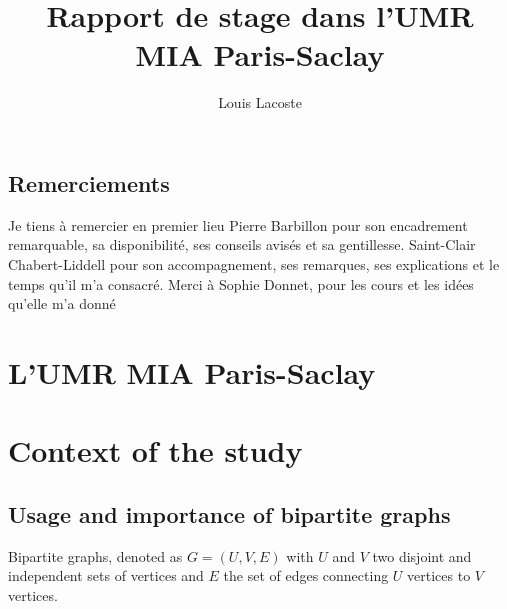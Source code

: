 \documentclass[12pt,a4paper]{report}
\title{Rapport de stage dans l'UMR MIA Paris-Saclay}
\author{Louis Lacoste}
\begin{document}
\maketitle
\tableofcontents

\section{Remerciements}

Je tiens à remercier en premier lieu Pierre Barbillon pour son encadrement
remarquable, sa disponibilité, ses conseils avisés et sa gentillesse.
Saint-Clair Chabert-Liddell pour son accompagnement, ses remarques,
ses explications et le temps qu'il m'a consacré. Merci à Sophie Donnet, pour les
cours et les idées qu'elle m'a donné


\chapter{L'UMR MIA Paris-Saclay}



\chapter{Context of the study}

\section{Usage and importance of bipartite graphs}
\label{sec:usage-and-importance-of-bipartite-graphs}
Bipartite graphs, denoted as $G = (U,V,E)$ with $U$ and $V$ two disjoint and
independent sets of vertices and $E$ the set of edges connecting $U$ vertices to
$V$ vertices.
\end{document}
